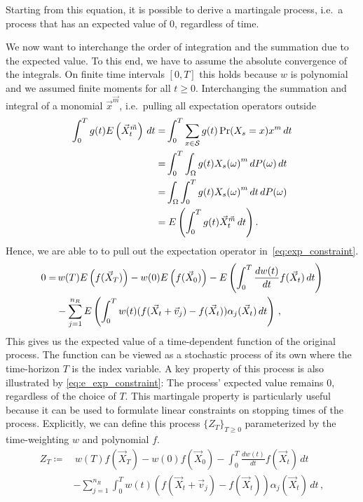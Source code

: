 Starting from this equation, it is possible to derive a martingale process,
i.e.\ a process that has an expected value of 0, regardless of time.


We now want to interchange the order of integration and the summation due to the expected value.
To this end, we have to assume the absolute convergence of the integrals.
On finite time intervals $[0,T]$ this holds because $w$
is polynomial and we assumed finite moments for all $t\geq 0$.
Interchanging the  summation  and integral of a monomial
${\vec{x}}^{\vec{m}}$, i.e.\ pulling all expectation operators outside
\begin{equation*}
\begin{split}
\int_{0}^Tg(t){E}\left(\vec X_t^{\vec m}\right)\,dt
 =&\int_{0}^T\sum_{x\in\mathcal{S}}g(t)\Pr(X_s=x)x^m\,dt\\
 =&\int_{0}^T\int_{\Omega} g(t) {X_s(\omega)}^m\,dP(\omega)\,dt\\
 =&\int_{\Omega}\int_{0}^T g(t) {X_s(\omega)}^m\,dt\,dP(\omega)\\
=&\;{E}\left(\int_{0}^Tg(t){\vec X}_t^{\vec m}\,dt\right).
\end{split}
\end{equation*}
Hence, we are able to to pull out the expectation operator in~\eqref{eq:exp_constraint}.
\begin{equation}\label{eq:e_exp_constraint}
\begin{split}
    0=&\,w(T){E}\left(f(\vec X_T)\right) - w(0){E}\left(f(\vec X_{0})\right) -
    {E}\left(\int_{0}^T\frac{dw(t)}{dt}f(\vec X_t)\,dt\right)\\
    &-\sum_{j=1}^{n_R}{E}\left(\int_{0}^Tw(t)
         (f(\vec X_t+\vec v_j) - f(\vec X_t))\alpha_j(\vec X_t)\,dt\right)\,,
         \end{split}
\end{equation}
This gives us the expected value of a time-dependent function of the original process.
The function can be viewed as a stochastic process of its own where the
time-horizon $T$ is the index variable. A key property
of this process is also illustrated by \eqref{eq:e_exp_constraint}: The process'
expected value remains 0, regardless of the choice of $T$.
This martingale property is particularly useful because it can be used
to formulate linear constraints on stopping times of the process.
Explicitly, we can define this process $\{Z_T\}_{T\geq 0}$ parameterized by
the time-weighting $w$ and polynomial $f$.
\begin{equation}\label{eq:martingale}
\begin{split}
    Z_T\coloneqq&\,w(T)f(\vec X_T) - w(0)f(\vec X_{0}) -
    \int_{0}^T\frac{dw(t)}{dt}f(\vec X_t)\,dt\\
    &-\sum_{j=1}^{n_R}\int_{0}^Tw(t)
         (f(\vec X_t+\vec v_j) - f(\vec X_t))\alpha_j(\vec X_t)\,dt\,,
         \end{split}
\end{equation}
